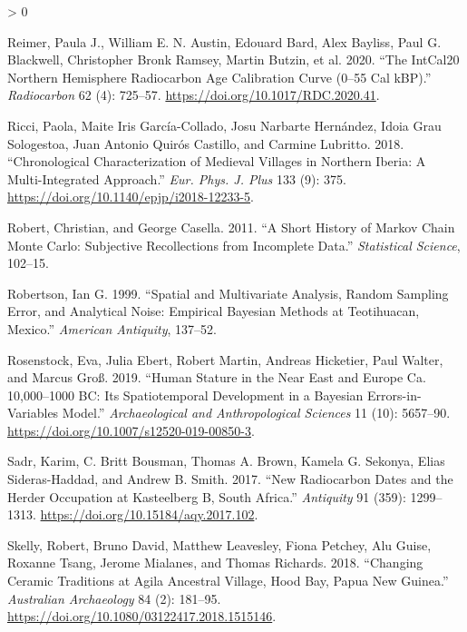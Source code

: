 \documentclass[
]{article}
\newlength{\cslhangindent}
\newenvironment{CSLReferences}[2] %
 {%
  \setlength{\parindent}{0pt}
  \ifodd #1 \everypar{\setlength{\hangindent}{\cslhangindent}}\ignorespaces\fi
  \ifnum #2 > 0
  \setlength{\parskip}{#2\baselineskip}
  \fi
 }%
 {}
\begin{document}
\begin{CSLReferences}{1}{0}
\leavevmode\hypertarget{ref-reimer_intcal20_2020}{}%
Reimer, Paula J., William E. N. Austin, Edouard Bard, Alex Bayliss, Paul
G. Blackwell, Christopher Bronk Ramsey, Martin Butzin, et al. 2020.
{``The {IntCal20} {Northern} {Hemisphere} {Radiocarbon} {Age}
{Calibration} {Curve} (0--55 Cal {kBP}).''} \emph{Radiocarbon} 62 (4):
725--57. \url{https://doi.org/10.1017/RDC.2020.41}.

\leavevmode\hypertarget{ref-ricci_chronological_2018}{}%
Ricci, Paola, Maite Iris García-Collado, Josu Narbarte Hernández, Idoia
Grau Sologestoa, Juan Antonio Quirós Castillo, and Carmine Lubritto.
2018. {``Chronological Characterization of {Medieval} {Villages} in
{Northern} {Iberia}: {A} Multi-Integrated Approach.''} \emph{Eur. Phys.
J. Plus} 133 (9): 375. \url{https://doi.org/10.1140/epjp/i2018-12233-5}.

\leavevmode\hypertarget{ref-robert_short_2011}{}%
Robert, Christian, and George Casella. 2011. {``A Short History of
{Markov} Chain {Monte} {Carlo}: {Subjective} Recollections from
Incomplete Data.''} \emph{Statistical Science}, 102--15.

\leavevmode\hypertarget{ref-robertson_spatial_1999}{}%
Robertson, Ian G. 1999. {``Spatial and Multivariate Analysis, Random
Sampling Error, and Analytical Noise: Empirical {Bayesian} Methods at
{Teotihuacan}, {Mexico}.''} \emph{American Antiquity}, 137--52.

\leavevmode\hypertarget{ref-rosenstock_human_2019}{}%
Rosenstock, Eva, Julia Ebert, Robert Martin, Andreas Hicketier, Paul
Walter, and Marcus Groß. 2019. {``Human Stature in the {Near} {East} and
{Europe} Ca. 10,000--1000 {BC}: Its Spatiotemporal Development in a
{Bayesian} Errors-in-Variables Model.''} \emph{Archaeological and
Anthropological Sciences} 11 (10): 5657--90.
\url{https://doi.org/10.1007/s12520-019-00850-3}.

\leavevmode\hypertarget{ref-sadr_new_2017}{}%
Sadr, Karim, C. Britt Bousman, Thomas A. Brown, Kamela G. Sekonya, Elias
Sideras-Haddad, and Andrew B. Smith. 2017. {``New Radiocarbon Dates and
the Herder Occupation at {Kasteelberg} {B}, {South} {Africa}.''}
\emph{Antiquity} 91 (359): 1299--1313.
\url{https://doi.org/10.15184/aqy.2017.102}.

\leavevmode\hypertarget{ref-skelly_changing_2018}{}%
Skelly, Robert, Bruno David, Matthew Leavesley, Fiona Petchey, Alu
Guise, Roxanne Tsang, Jerome Mialanes, and Thomas Richards. 2018.
{``Changing Ceramic Traditions at {Agila} Ancestral Village, {Hood}
{Bay}, {Papua} {New} {Guinea}.''} \emph{Australian Archaeology} 84 (2):
181--95. \url{https://doi.org/10.1080/03122417.2018.1515146}.


\end{CSLReferences}
\end{document}
